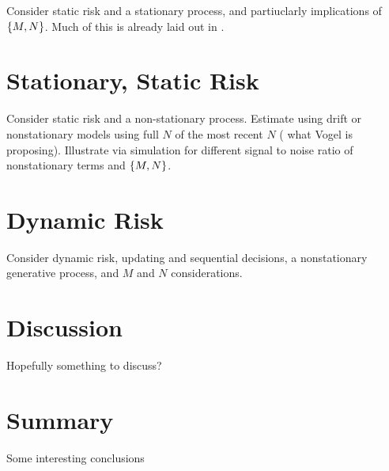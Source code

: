 \documentclass[11pt]{article}
\begin{document}
Consider static risk and a stationary process, and partiuclarly implications of \(\qty{M, N}\).
Much of this is already laid out in \citet{Lall1987}.

\section{Stationary, Static Risk}

Consider static risk and a non-stationary process.
Estimate using drift or nonstationary models using full \(N\) of the most recent \(N\) (\ie{} what Vogel is proposing).
Illustrate via simulation for different signal to noise ratio of nonstationary terms and \(\qty{M, N}\).

\section{Dynamic Risk}

Consider dynamic risk, \ie{} updating and sequential decisions, a nonstationary generative process, and \(M\) and \(N\) considerations.

\section{Discussion}

Hopefully something to discuss?

\section{Summary}

Some interesting conclusions



\clearpage
\printbibliography{}
\end{document}
